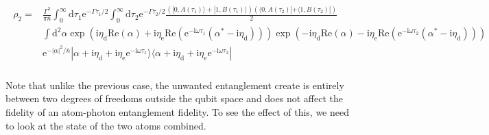 \documentclass[10pt,fleqn]{article}
\newcommand{\ud}{\mathrm{d}}
\newcommand{\ue}{\mathrm{e}}
\newcommand{\ui}{\mathrm{i}}
\newcommand{\eqar}[1]
{
  \begin{align}
    #1
  \end{align}
}
\newcommand{\paren}[1]{{\left({#1}\right)}}
\newcommand{\abs}[1]{{\left|{#1}\right|}}
\begin{document}
\eqar{
  \begin{split}
    \rho_2=&\frac{\Gamma^2}{\pi {\bar n}}\int_0^\infty\ud\tau_1\ue^{-\Gamma\tau_1/2}\int_0^\infty\ud\tau_2\ue^{-\Gamma\tau_2/2}\frac{\paren{|0,A(\tau_1)\rangle+|1,B(\tau_1)\rangle}\paren{\langle 0,A(\tau_2)|+\langle 1,B(\tau_2)|}}{2}\\
           &\int\ud^2\alpha
             \exp\paren{\ui\eta_{\mathrm{d}}\mathrm{Re}(\alpha)+\ui\eta_{\mathrm{e}}\mathrm{Re}(\ue^{-\ui\omega\tau_1}(\alpha^*-\ui\eta_{\mathrm{d}}))}
             \exp\paren{-\ui\eta_{\mathrm{d}}\mathrm{Re}(\alpha)-\ui\eta_{\mathrm{e}}\mathrm{Re}(\ue^{-\ui\omega\tau_2}(\alpha^*-\ui\eta_{\mathrm{d}}))}\\
           &\ue^{-\abs{\alpha}^2/{\bar n}}|\alpha+\ui\eta_{\mathrm{d}}+\ui\eta_{\mathrm{e}}\ue^{-\ui\omega\tau_1}\rangle
             \langle\alpha+\ui\eta_{\mathrm{d}}+\ui\eta_{\mathrm{e}}\ue^{-\ui\omega\tau_2}|\\
  \end{split}
}
Note that unlike the previous case, the unwanted entanglement create is entirely
between two degrees of freedoms outside the qubit space
and does not affect the fidelity of an atom-photon entanglement fidelity.
To see the effect of this, we need to look at the state of the two atoms combined.
\end{document}
